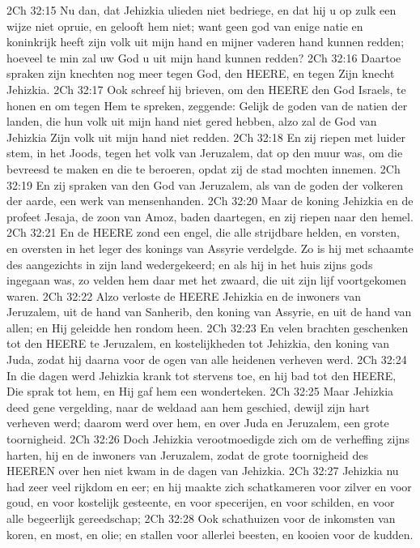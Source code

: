 2Ch 32:15  Nu dan, dat Jehizkia ulieden niet bedriege, en dat hij u op zulk een wijze niet opruie, en gelooft hem niet; want geen god van enige natie en koninkrijk heeft zijn volk uit mijn hand en mijner vaderen hand kunnen redden; hoeveel te min zal uw God u uit mijn hand kunnen redden?
2Ch 32:16  Daartoe spraken zijn knechten nog meer tegen God, den HEERE, en tegen Zijn knecht Jehizkia.
2Ch 32:17  Ook schreef hij brieven, om den HEERE den God Israels, te honen en om tegen Hem te spreken, zeggende: Gelijk de goden van de natien der landen, die hun volk uit mijn hand niet gered hebben, alzo zal de God van Jehizkia Zijn volk uit mijn hand niet redden.
2Ch 32:18  En zij riepen met luider stem, in het Joods, tegen het volk van Jeruzalem, dat op den muur was, om die bevreesd te maken en die te beroeren, opdat zij de stad mochten innemen.
2Ch 32:19  En zij spraken van den God van Jeruzalem, als van de goden der volkeren der aarde, een werk van mensenhanden.
2Ch 32:20  Maar de koning Jehizkia en de profeet Jesaja, de zoon van Amoz, baden daartegen, en zij riepen naar den hemel.
2Ch 32:21  En de HEERE zond een engel, die alle strijdbare helden, en vorsten, en oversten in het leger des konings van Assyrie verdelgde. Zo is hij met schaamte des aangezichts in zijn land wedergekeerd; en als hij in het huis zijns gods ingegaan was, zo velden hem daar met het zwaard, die uit zijn lijf voortgekomen waren.
2Ch 32:22  Alzo verloste de HEERE Jehizkia en de inwoners van Jeruzalem, uit de hand van Sanherib, den koning van Assyrie, en uit de hand van allen; en Hij geleidde hen rondom heen.
2Ch 32:23  En velen brachten geschenken tot den HEERE te Jeruzalem, en kostelijkheden tot Jehizkia, den koning van Juda, zodat hij daarna voor de ogen van alle heidenen verheven werd.
2Ch 32:24  In die dagen werd Jehizkia krank tot stervens toe, en hij bad tot den HEERE, Die sprak tot hem, en Hij gaf hem een wonderteken.
2Ch 32:25  Maar Jehizkia deed gene vergelding, naar de weldaad aan hem geschied, dewijl zijn hart verheven werd; daarom werd over hem, en over Juda en Jeruzalem, een grote toornigheid.
2Ch 32:26  Doch Jehizkia verootmoedigde zich om de verheffing zijns harten, hij en de inwoners van Jeruzalem, zodat de grote toornigheid des HEEREN over hen niet kwam in de dagen van Jehizkia.
2Ch 32:27  Jehizkia nu had zeer veel rijkdom en eer; en hij maakte zich schatkameren voor zilver en voor goud, en voor kostelijk gesteente, en voor specerijen, en voor schilden, en voor alle begeerlijk gereedschap;
2Ch 32:28  Ook schathuizen voor de inkomsten van koren, en most, en olie; en stallen voor allerlei beesten, en kooien voor de kudden.

